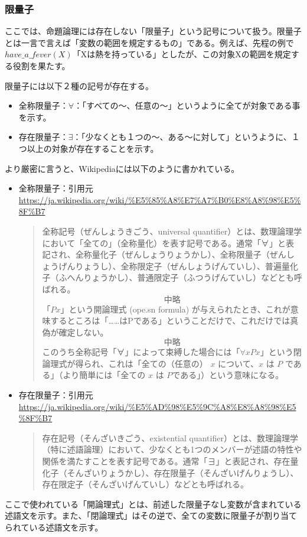 \documentclass[dvipdfmx]{jsarticle}
\begin{document}
  \subsubsection{限量子}
ここでは、命題論理には存在しない「限量子」という記号について扱う。限量子とは一言で言えば「変数の範囲を規定するもの」である。例えば、先程の例で$have\_a\_fever(X)$「Xは熱を持っている」としたが、この対象Xの範囲を規定する役割を果たす。\par
限量子には以下２種の記号が存在する。
\begin{itemize}
  \item 全称限量子：$\forall$：「すべての〜、任意の〜」というように全てが対象である事を示す。
  \item 存在限量子：$\exists$：「少なくとも１つの〜、ある〜に対して」というように、１つ以上の対象が存在することを示す。
\end{itemize}
より厳密に言うと、Wikipediaには以下のように書かれている。
\begin{itemize}
  \item 全称限量子：引用元\url{https://ja.wikipedia.org/wiki/%E5%85%A8%E7%A7%B0%E8%A8%98%E5%8F%B7}
  \begin{quote}
    全称記号（ぜんしょうきごう、universal quantifier）とは、数理論理学において「全ての」（全称量化）を表す記号である。通常「∀」と表記され、全称量化子（ぜんしょうりょうかし）、全称限量子（ぜんしょうげんりょうし）、全称限定子（ぜんしょうげんていし）、普遍量化子（ふへんりょうかし）、普通限定子（ふつうげんていし）などとも呼ばれる。
    \[中略\]
    「$Px$」という開論理式 (ope.sn formula) が与えられたとき、これが意味するところは「……はPである」ということだけで、これだけでは真偽が確定しない。\[中略\]
    このうち全称記号「∀」によって束縛した場合には「$\forall x Px$」という閉論理式が得られ、これは「全ての（任意の） $x$ について、$x$ は $P$ である」（より簡単には「全ての $x$ は $P$である」）という意味になる。
  \end{quote}
  \item 存在限量子：引用元\url{https://ja.wikipedia.org/wiki/%E5%AD%98%E5%9C%A8%E8%A8%98%E5%8F%B7}
  \begin{quote}
    存在記号（そんざいきごう、existential quantifier）とは、数理論理学（特に述語論理）において、少なくとも1つのメンバーが述語の特性や関係を満たすことを表す記号である。通常「∃」と表記され、存在量化子（そんざいりょうかし）、存在限量子（そんざいげんりょうし）、存在限定子（そんざいげんていし）などとも呼ばれる。
  \end{quote}
\end{itemize}
ここで使われている「開論理式」とは、前述した限量子なし変数が含まれている述語文を示す。また、「閉論理式」はその逆で、全ての変数に限量子が割り当てられている述語文を示す。
\end{document}
